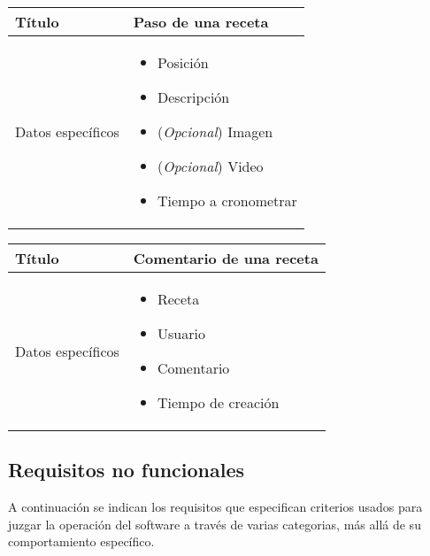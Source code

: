 \begin{center}  
  \begin{tabularx}{\textwidth}{|l|X|}
    \hline

    Título & Paso de una receta\\

    \hline
    Datos específicos &

    \begin{itemize}
    \item Posición
    \item Descripción
    \item (\textit{Opcional}) Imagen
    \item (\textit{Opcional}) Video
    \item Tiempo a cronometrar
    \end{itemize}
    \\
    
    \hline
    
  \end{tabularx}
\end{center}

\begin{center}  
  \begin{tabularx}{\textwidth}{|l|X|}
    \hline

    Título & Comentario de una receta\\

    \hline
    Datos específicos &

    \begin{itemize}
    \item Receta
    \item Usuario
    \item Comentario
    \item Tiempo de creación
    \end{itemize}
    \\
    
    \hline
    
  \end{tabularx}
\end{center}


\subsection{Requisitos no funcionales}

A continuación se indican los requisitos que especifican criterios usados para
juzgar la operación del software a través de varias categorias, más allá de su
comportamiento específico.

